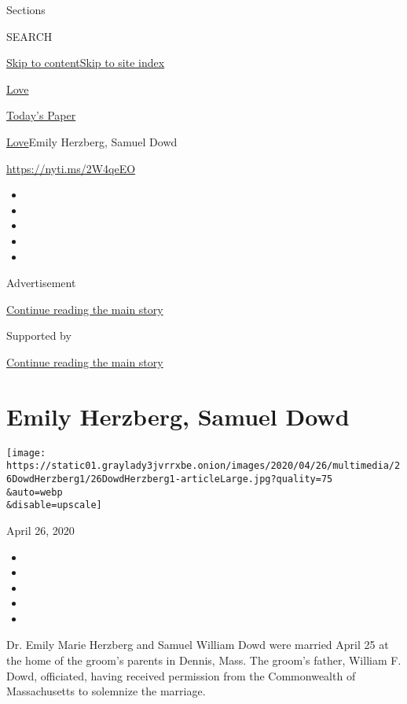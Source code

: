 Sections

SEARCH

\protect\hyperlink{site-content}{Skip to
content}\protect\hyperlink{site-index}{Skip to site index}

\href{https://www.nytimes3xbfgragh.onion/section/fashion/weddings}{Love}

\href{https://myaccount.nytimes3xbfgragh.onion/auth/login?response_type=cookie\&client_id=vi}{}

\href{https://www.nytimes3xbfgragh.onion/section/todayspaper}{Today's
Paper}

\href{/section/fashion/weddings}{Love}\textbar{}Emily Herzberg, Samuel
Dowd

\href{https://nyti.ms/2W4qeEO}{https://nyti.ms/2W4qeEO}

\begin{itemize}
\item
\item
\item
\item
\item
\end{itemize}

Advertisement

\protect\hyperlink{after-top}{Continue reading the main story}

Supported by

\protect\hyperlink{after-sponsor}{Continue reading the main story}

\hypertarget{emily-herzberg-samuel-dowd}{%
\section{Emily Herzberg, Samuel Dowd}\label{emily-herzberg-samuel-dowd}}

\texttt{[image: https://static01.graylady3jvrrxbe.onion/images/2020/04/26/multimedia/26DowdHerzberg1/26DowdHerzberg1-articleLarge.jpg?quality=75\\\&auto=webp\\\&disable=upscale]}

April 26, 2020

\begin{itemize}
\item
\item
\item
\item
\item
\end{itemize}

Dr. Emily Marie Herzberg and Samuel William Dowd were married April 25
at the home of the groom's parents in Dennis, Mass. The groom's father,
William F. Dowd, officiated, having received permission from the
Commonwealth of Massachusetts to solemnize the marriage.

